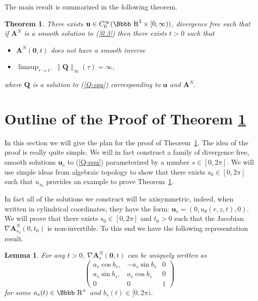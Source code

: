 \documentclass[12pt,twoside]{article}
\newcommand{\bA}{\mathbf{A}}
\newtheorem{theo}{Theorem}[section]
\newtheorem{lema}{Lemma}[section]
\newcommand {\rdd}{\mbox{\Bbbb R}}
\newcommand {\bnul}{{\mathbf {0}}}
\newcommand {\bu}{{\mathbf{u}}}
\newcommand {\bQ}{{\mathbf{Q}}}
\begin{document}
The main result is summarized in the following theorem.
\begin{theo} \label {t 0.1}
There exists $\bu \in C^\infty_0(\rdd^3 \times [0,\infty))$, divergence free such 
that if $\bA^N$ is a smooth solution to (\ref{0.3})
then there exists $t>0$ such that
\begin{itemize}
\item [(a)] $\bA^N(\bnul, t)$ does not have a smooth inverse
\item [(b)] $\limsup_{\tau \to t^-} \|\bQ\|_\infty(\tau) = \infty$,
\end{itemize}
where $\bQ$ is a solution to (\ref{Q-equ})
corresponding to $\bu$ 
and $\bA^N$.
\end{theo}










\section{Outline of the Proof of Theorem \ref{t 0.1}}   
\setcounter{equation}{0}

In this section we will give the plan for the proof of Theorem~\ref{t 0.1}.
The idea of the proof is really quite simple.  We will in fact construct
a family of divergence free, smooth solutions $\bu_s$ 
to (\ref{Q-equ})
parameterized by a number $s \in [0,2\pi]$.  We will use simple ideas
from algebraic topology to show that there exists $s_0 \in [0,2\pi]$ such that
$u_{s_0}$ provides an example to prove Theorem~\ref{t 0.1}.

In fact all of the solutions we construct will be axisymmetric, indeed,
when written in cylindrical coordinates, they have the form:
$\bu_s = (0, u_\theta(r,z,t), 0)$.
We will prove that there exists $s_0 \in [0,2\pi]$ and $t_0>0$ 
such that the Jacobian $\nabla \bA^N_{s_0}(0,t_0)$ is non-invertible.
To this end we have the following representation result.

\begin{lema} \label{c 5.1}
For any $t>0$, $\nabla \bA^N_s(\bnul, t)$ can be 
uniquely written as
$$
\left(\begin{array}{lll}
a_s \cos b_s, & -a_s \sin b_s & 0\\
a_s \sin b_s, &  a_s \cos b_s & 0\\
0 & 0 & 1
\end{array} \right)
$$
for some $a_s(t)\in \rdd^+$ and $b_s(t) \in [0,2\pi)$.
\end{lema}
\end{document}

